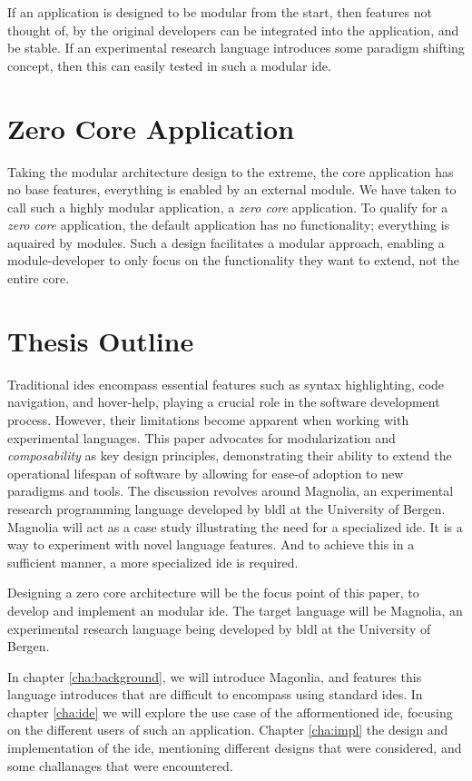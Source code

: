 If an application is designed to be modular from the start, then features not
thought of, by the original developers can be integrated into the application,
and be stable. If an experimental research language introduces some paradigm
shifting concept, then this can easily tested in such a modular \gls{ide}.

\section{Zero Core Application}

Taking the modular architecture design to the extreme, the core application has
no base features, everything is enabled by an external module. We have taken to
call such a highly modular application, a \textit{zero core} application. To
qualify for a \textit{zero core} application, the default application has no
functionality; everything is aquaired by modules. Such a design facilitates a
modular approach, enabling a module-developer to only focus on the functionality
they want to extend, not the entire core.

\section{Thesis Outline}

Traditional \gls{ide}s encompass essential features such as syntax highlighting, code
navigation, and hover-help, playing a crucial role in the software development
process. However, their limitations become apparent when working with
experimental languages. This paper advocates for modularization and
\textit{composability} as key design principles, demonstrating their ability to
extend the operational lifespan of software by allowing for ease-of adoption to
new paradigms and tools. The discussion revolves around Magnolia, an
experimental research programming language developed by \gls{bldl} at the
University of Bergen. Magnolia will act as a case study illustrating the need for
a specialized \gls{ide}. It is a way to experiment with novel language features.
And to achieve this in a sufficient manner, a more specialized \gls{ide} is
required.

Designing a zero core architecture will be the focus point of this paper, to
develop and implement an modular \gls{ide}. The target language will be Magnolia,
an experimental research language being developed by \gls{bldl} at the University
of Bergen.

In chapter \ref{cha:background}, we will introduce Magonlia, and features this
language introduces that are difficult to encompass using standard \gls{ide}s.
In chapter \ref{cha:ide} we will explore the use case of the afformentioned
\gls{ide}, focusing on the different users of such an application. Chapter
\ref{cha:impl} the design and implementation of the \gls{ide}, mentioning
different designs that were considered, and some challanages that were
encountered.
